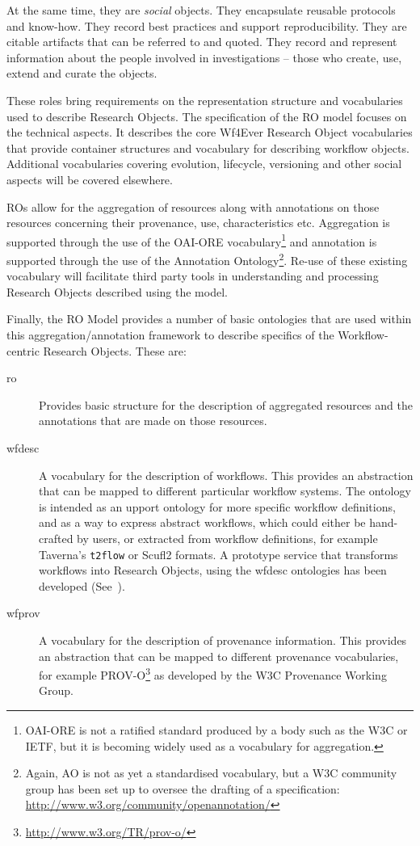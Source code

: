 At the same time, they are \emph{social} objects. They encapsulate reusable protocols and know-how. They record best practices and support reproducibility. They are citable artifacts that can be referred to and quoted. They record and represent information about the people involved in investigations -- those who create, use, extend and curate the objects.

These roles bring requirements on the representation structure and vocabularies used to describe Research Objects. The specification of the RO model focuses on the technical aspects. It describes the core Wf4Ever Research Object vocabularies that provide container structures and vocabulary for describing workflow objects. Additional vocabularies covering evolution, lifecycle, versioning and other social aspects will be covered elsewhere.

ROs allow for the aggregation of resources along with annotations on
those resources concerning their provenance, use, characteristics
etc. Aggregation is supported through the use of the OAI-ORE
vocabulary\footnote{OAI-ORE is not a ratified standard
  produced by a body such as the W3C or IETF, but it is becoming
  widely used as a vocabulary for aggregation.} and annotation is
supported through the use of the Annotation Ontology\footnote{Again,
  AO is not as yet a standardised vocabulary, but a W3C community
  group has been set up to oversee the drafting of a specification: \url{http://www.w3.org/community/openannotation/}}. Re-use of these existing vocabulary will facilitate third party tools in understanding and processing Research Objects described using the model. 


Finally, the RO Model provides a number of basic ontologies that are used within this aggregation/annotation framework to describe specifics of the Workflow-centric Research Objects. These are:

\begin{description}
\item[ro] Provides basic structure for the description of aggregated
  resources and the annotations that are made on those resources.
\item[wfdesc] A vocabulary for the description of workflows. This
  provides an abstraction that can be mapped to different particular
  workflow systems. The ontology is intended as an upport ontology for more specific workflow definitions, and as a way to express abstract workflows, which could either be hand-crafted by users, or extracted from workflow definitions, for example Taverna's \texttt{t2flow} or Scufl2 formats. A prototype service that transforms workflows into Research Objects, using the wfdesc ontologies has been developed (See~\cite{D1.4v1}). 
\item[wfprov] A vocabulary for the description of provenance
  information. This provides an abstraction that can be mapped to
  different provenance vocabularies, for example PROV-O\footnote{\url{http://www.w3.org/TR/prov-o/}} as developed by the W3C Provenance Working Group.
\end{description}

